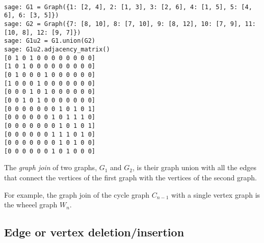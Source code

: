 %
\begin{center}
\fontsize{9pt}{9pt}
\selectfont
\tt
\begin{lstlisting}
sage: G1 = Graph({1: [2, 4], 2: [1, 3], 3: [2, 6], 4: [1, 5], 5: [4, 6], 6: [3, 5]})
sage: G2 = Graph({7: [8, 10], 8: [7, 10], 9: [8, 12], 10: [7, 9], 11: [10, 8], 12: [9, 7]})
sage: G1u2 = G1.union(G2)
sage: G1u2.adjacency_matrix()
[0 1 0 1 0 0 0 0 0 0 0 0]
[1 0 1 0 0 0 0 0 0 0 0 0]
[0 1 0 0 0 1 0 0 0 0 0 0]
[1 0 0 0 1 0 0 0 0 0 0 0]
[0 0 0 1 0 1 0 0 0 0 0 0]
[0 0 1 0 1 0 0 0 0 0 0 0]
[0 0 0 0 0 0 0 1 0 1 0 1]
[0 0 0 0 0 0 1 0 1 1 1 0]
[0 0 0 0 0 0 0 1 0 1 0 1]
[0 0 0 0 0 0 1 1 1 0 1 0]
[0 0 0 0 0 0 0 1 0 1 0 0]
[0 0 0 0 0 0 1 0 1 0 0 0]
\end{lstlisting}
\end{center}
%


The {\it graph join} of two graphs, $G_1$ and $G_2$,
is their graph union with all the edges
that connect the vertices of the first graph with the vertices of the
second graph.

For example, the graph join of the cycle graph $C_{n-1}$ with a 
single vertex graph is the wheeel graph $W_n$.


%



\subsection{Edge or vertex deletion/insertion}

